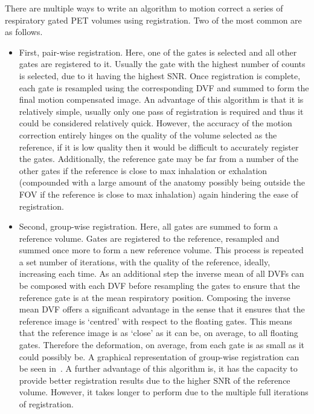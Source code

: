             There are multiple ways to write an algorithm to motion correct a series of respiratory gated \gls{PET} volumes using registration. Two of the most common are as follows.
            
            \begin{itemize}
                \item First, pair-wise registration. Here, one of the gates is selected and all other gates are registered to it. Usually the gate with the highest number of counts is selected, due to it having the highest \gls{SNR}. Once registration is complete, each gate is resampled using the corresponding \gls{DVF} and summed to form the final motion compensated image. An advantage of this algorithm is that it is relatively simple, usually only one pass of registration is required and thus it could be considered relatively quick. However, the accuracy of the motion correction entirely hinges on the quality of the volume selected as the reference, if it is low quality then it would be difficult to accurately register the gates. Additionally, the reference gate may be far from a number of the other gates if the reference is close to max inhalation or exhalation (compounded with a large amount of the anatomy possibly being outside the \gls{FOV} if the reference is close to max inhalation) again hindering the ease of registration.
                
                \item Second, group-wise registration. Here, all gates are summed to form a reference volume. Gates are registered to the reference, resampled and summed once more to form a new reference volume. This process is repeated a set number of iterations, with the quality of the reference, ideally, increasing each time. As an additional step the inverse mean of all \glspl{DVF} can be composed with each \gls{DVF} before resampling the gates to ensure that the reference gate is at the mean respiratory position. Composing the inverse mean \gls{DVF} offers a significant advantage in the sense that it ensures that the reference image is `centred' with respect to the floating gates. This means that the reference image is as `close' as it can be, on average, to all floating gates. Therefore the deformation, on average, from each gate is as small as it could possibly be. A graphical representation of group-wise registration can be seen in~. A further advantage of this algorithm is, it has the capacity to provide better registration results due to the higher \gls{SNR} of the reference volume. However, it takes longer to perform due to the multiple full iterations of registration.
            \end{itemize}
            
